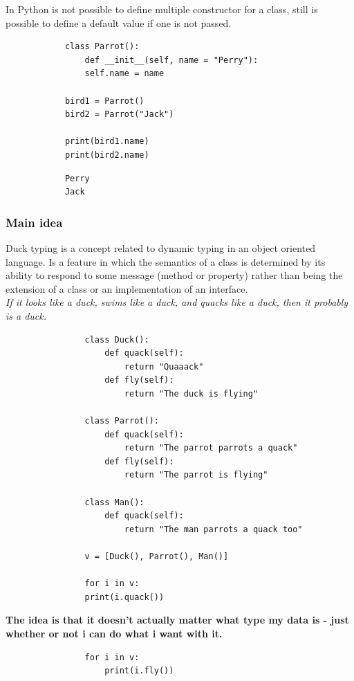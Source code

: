 \documentclass[12pt]{article}
\begin{document}
		In Python is not possible to define multiple constructor for a class, still is possible to define a default value if one is not passed.
		
		\begin{lstlisting}
			class Parrot():
				def __init__(self, name = "Perry"):
				self.name = name
			
			bird1 = Parrot()
			bird2 = Parrot("Jack")
			
			print(bird1.name)
			print(bird2.name)
		\end{lstlisting}
		
		\begin{lstlisting}
			Perry
			Jack
		\end{lstlisting}
		
		
		\subsubsection{Main idea}
			
			Duck typing is a concept related to dynamic typing in an object oriented language. Is a feature in which the semantics of a class is determined by its ability to respond to some message (method or property) rather than being the extension of a class or an implementation of an interface. \\

			\textit{ If it looks like a duck, swims like a duck, and quacks like a duck, then it probably is a duck.}\\
			
			\begin{lstlisting}
				class Duck():
					def quack(self):
						return "Quaaack"
					def fly(self):
						return "The duck is flying"
				
				class Parrot():
					def quack(self):
						return "The parrot parrots a quack"
					def fly(self):
						return "The parrot is flying"
				
				class Man():
					def quack(self):
						return "The man parrots a quack too"
				
				v = [Duck(), Parrot(), Man()]
				
				for i in v:
				print(i.quack())
			\end{lstlisting}
			
			\textbf{The idea is that it doesn't actually matter what type my data is - just whether or not i can do what i want with it.}\\
			
			\begin{lstlisting}	
				for i in v:
					print(i.fly())
			\end{lstlisting}
			
\end{document}
